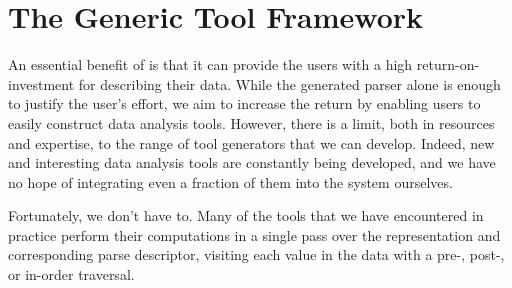 \section{The Generic Tool Framework}
\label{sec:gen-tool}


An essential benefit of \padsml{} is that it can provide the users
with a high return-on-investment for describing their data. While the
generated parser alone is enough to justify the user's effort, we aim
to increase the return by enabling users to easily construct data
analysis tools. However, there is a limit, both in resources and
expertise, to the range of tool generators that we can develop.
Indeed, new and interesting data analysis tools are constantly being
developed, and we have no hope of integrating even a fraction of them
into the \padsml{} system ourselves.

Fortunately, we don't have to. Many of the tools that we have
encountered in practice perform their computations in a single pass
over the representation and corresponding parse descriptor, visiting
each value in the data with a pre-, post-, or in-order traversal.


